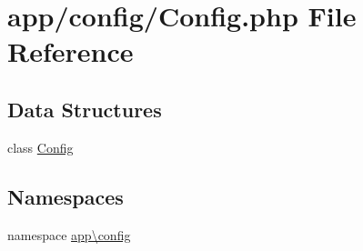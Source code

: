 \hypertarget{config_2_config_8php}{\section{app/config/\-Config.php File Reference}
\label{config_2_config_8php}
}
\subsection*{Data Structures}
\begin{DoxyCompactItemize}
\item 
class \hyperlink{classapp_1_1config_1_1_config}{Config}
\end{DoxyCompactItemize}
\subsection*{Namespaces}
\begin{DoxyCompactItemize}
\item 
namespace \hyperlink{namespaceapp_1_1config}{app\textbackslash{}config}
\end{DoxyCompactItemize}
